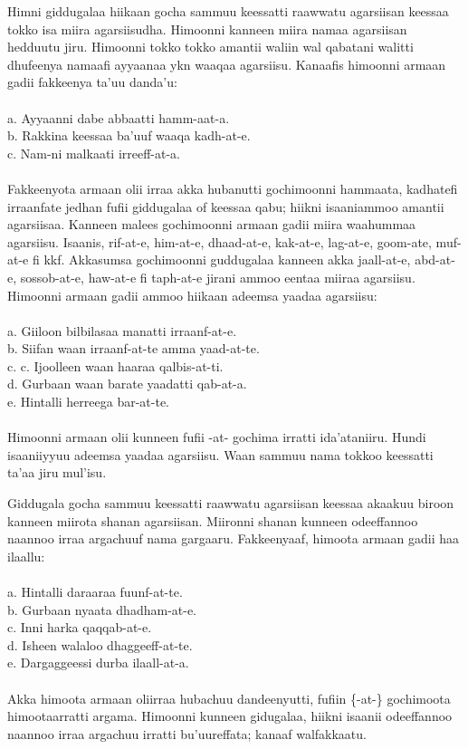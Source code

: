 \documentclass[11pt,b5paper]{book}
\begin{document}
Himni giddugalaa hiikaan gocha sammuu keessatti raawwatu agarsiisan keessaa tokko isa miira agarsiisudha. Himoonni kanneen miira namaa agarsiisan hedduutu jiru. Himoonni tokko
tokko amantii waliin wal qabatani walitti dhufeenya namaafi ayyaanaa ykn waaqaa agarsiisu. Kanaafis himoonni armaan gadii fakkeenya ta’uu danda’u:\\
\\
a. Ayyaanni dabe abbaatti hamm-aat-a.\\
b. Rakkina keessaa ba’uuf waaqa kadh-at-e.\\
c. Nam-ni malkaati irreeff-at-a. \\
\\
Fakkeenyota armaan olii irraa akka hubanutti gochimoonni hammaata, kadhatefi irraanfate jedhan fufii giddugalaa of keessaa qabu; hiikni isaaniammoo amantii agarsiisaa. Kanneen malees gochimoonni armaan gadii miira waahummaa agarsiisu. Isaanis, rif-at-e, him-at-e, dhaad-at-e, kak-at-e, lag-at-e, goom-ate, muf-at-e fi kkf. Akkasumsa gochimoonni guddugalaa kanneen akka jaall-at-e, abd-at-e, sossob-at-e, haw-at-e fi taph-at-e jirani ammoo eentaa miiraa agarsiisu. Himoonni armaan gadii ammoo hiikaan adeemsa yaadaa agarsiisu: \\
\\
a. Giiloon bilbilasaa manatti irraanf-at-e.\\
b. Siifan waan irraanf-at-te amma yaad-at-te.\\
c. c. Ijoolleen waan haaraa qalbis-at-ti.\\
d. Gurbaan waan barate yaadatti qab-at-a.\\
e. Hintalli herreega bar-at-te.\\
\\
Himoonni armaan olii kunneen fufii -at- gochima irratti ida'ataniiru. Hundi isaaniiyyuu adeemsa yaadaa agarsiisu. Waan sammuu nama tokkoo keessatti ta'aa jiru mul'isu. 

Giddugala gocha sammuu keessatti raawwatu agarsiisan keessaa akaakuu biroon kanneen miirota shanan agarsiisan. Miironni shanan kunneen odeeffannoo naannoo irraa argachuuf nama gargaaru. Fakkeenyaaf, himoota armaan gadii haa ilaallu:\\
\\
a. Hintalli daraaraa fuunf-at-te.\\
b. Gurbaan nyaata dhadham-at-e.\\
c. Inni harka qaqqab-at-e.\\
d. Isheen walaloo dhaggeeff-at-te.\\
e. Dargaggeessi durba ilaall-at-a.\\
\\
Akka himoota armaan oliirraa hubachuu dandeenyutti, fufiin \{-at-\} gochimoota himootaarratti argama. Himoonni kunneen gidugalaa, hiikni isaanii odeeffannoo naannoo irraa argachuu irratti bu'uureffata; kanaaf walfakkaatu. 
\end{document}
